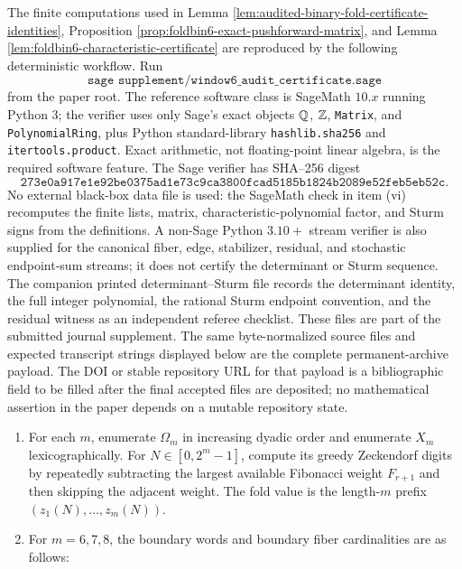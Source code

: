 \begin{proposition}\label{prop:audited-computation-reproducibility-certificate}
The finite computations used in Lemma \ref{lem:audited-binary-fold-certificate-identities}, Proposition \ref{prop:foldbin6-exact-pushforward-matrix}, and Lemma \ref{lem:foldbin6-characteristic-certificate} are reproduced by the following deterministic workflow.  Run
\[
\texttt{sage supplement/window6\_audit\_certificate.sage}
\]
from the paper root.  The reference software class is SageMath \(10.x\) running Python \(3\); the verifier uses only Sage's exact objects \(\mathbb{Q}\), \(\mathbb{Z}\), \texttt{Matrix}, and \texttt{PolynomialRing}, plus Python standard-library \texttt{hashlib.sha256} and \texttt{itertools.product}.  Exact arithmetic, not floating-point linear algebra, is the required software feature.  The Sage verifier has SHA--256 digest
\[
\texttt{273e0a917e1e92be0375ad1e73c9ca3800fcad5185b1824b2089e52feb5eb52c}.
\]
No external black-box data file is used: the SageMath check in item \textup{(vi)} recomputes the finite lists, matrix, characteristic-polynomial factor, and Sturm signs from the definitions.  A non-Sage Python \(3.10+\) stream verifier is also supplied for the canonical fiber, edge, stabilizer, residual, and stochastic endpoint-sum streams; it does not certify the determinant or Sturm sequence.  The companion printed determinant--Sturm file records the determinant identity, the full integer polynomial, the rational Sturm endpoint convention, and the residual witness as an independent referee checklist.  These files are part of the submitted journal supplement.  The same byte-normalized source files and expected transcript strings displayed below are the complete permanent-archive payload.  The DOI or stable repository URL for that payload is a bibliographic field to be filled after the final accepted files are deposited; no mathematical assertion in the paper depends on a mutable repository state.
\begin{enumerate}[label=\textup{(\roman*)}]
\item For each \(m\), enumerate \(\Omega_m\) in increasing dyadic order and enumerate \(X_m\) lexicographically.  For \(N\in[0,2^m-1]\), compute its greedy Zeckendorf digits by repeatedly subtracting the largest available Fibonacci weight \(F_{r+1}\) and then skipping the adjacent weight.  The fold value is the length-\(m\) prefix \((z_1(N),\ldots,z_m(N))\).
\item For \(m=6,7,8\), the boundary words and boundary fiber cardinalities are as follows:

\end{enumerate}
\end{proposition}
